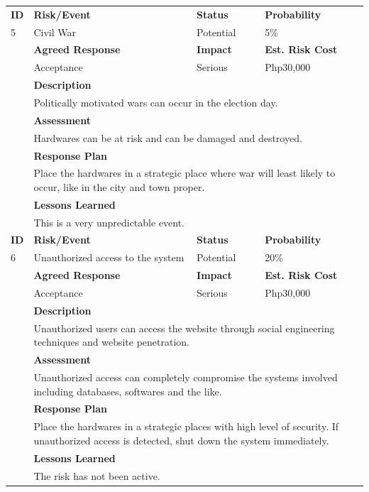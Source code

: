 \documentclass[a4paper, 11pt]{article}
\begin{document}
\begin{table}[H]
\begin{tabular}{l| l l l}
		\textbf{ID} & \textbf{Risk/Event} & \textbf{Status} & \textbf{Probability}\\
		5 & Civil War & Potential & 5\% \\
		& \textbf{Agreed Response} & \textbf{Impact} & \textbf{Est. Risk Cost} \\
		& Acceptance & Serious & Php30,000 \\
		& \textbf{Description} \\
		& \multicolumn{3}{p{\linewidth}}{Politically motivated wars can occur in the election day.} \\
		& \textbf{Assessment} \\
		& \multicolumn{3}{p{\linewidth}}{Hardwares can be at risk and can be damaged and destroyed.} \\
		& \textbf{Response Plan} \\
		& \multicolumn{3}{p{\linewidth}}{Place the hardwares in a strategic place where war will least likely to occur, like in the city and town proper.} \\
		& \textbf{Lessons Learned} \\
		& This is a very unpredictable event. \\
		\hline
		\textbf{ID} & \textbf{Risk/Event} & \textbf{Status} & \textbf{Probability}\\
		6 & Unauthorized access to the system & Potential & 20\% \\
		& \textbf{Agreed Response} & \textbf{Impact} & \textbf{Est. Risk Cost} \\
		& Acceptance & Serious & Php30,000 \\
		& \textbf{Description} \\
		& \multicolumn{3}{p{\linewidth}}{Unauthorized users can access the website through social engineering techniques and website penetration.} \\
		& \textbf{Assessment} \\
		& \multicolumn{3}{p{\linewidth}}{Unauthorized access can completely compromise the systems involved including databases, softwares and the like.} \\
		& \textbf{Response Plan} \\
		& \multicolumn{3}{p{\linewidth}}{Place the hardwares in a strategic places with high level of security. If unauthorized access is detected, shut down the system immediately.} \\
		& \textbf{Lessons Learned} \\
		& The risk has not been active.\\
	\end{tabular}
\end{table}
\end{document}

